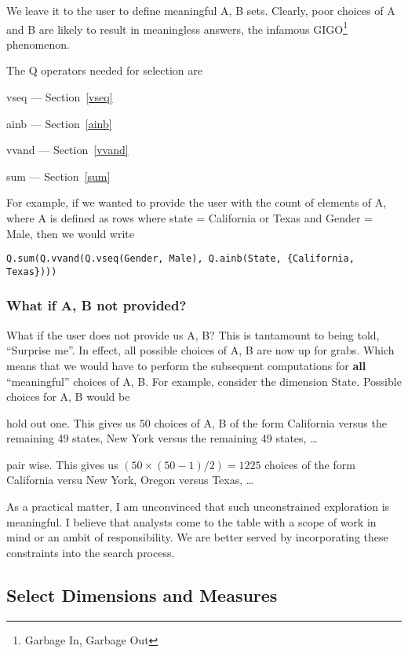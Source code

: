 We leave it to the user to define meaningful A, B sets.
Clearly, poor choices of A and B are likely to result in meaningless
answers, the infamous GIGO\footnote{Garbage In, Garbage Out} phenomenon.

The Q operators needed for selection are 
\be
\item vseq --- Section~\ref{vseq}
\item ainb --- Section~\ref{ainb}
\item vvand --- Section~\ref{vvand}
\item sum --- Section~\ref{sum}
\ee

For example, if we wanted to provide the user with the count of elements of A,
where A is defined as rows where state = California or Texas and Gender = Male,
then we would write
\begin{verbatim}
Q.sum(Q.vvand(Q.vseq(Gender, Male), Q.ainb(State, {California, Texas})))
\end{verbatim}


\subsubsection{What if A, B not provided?}

What if the user does not provide us A, B? This is tantamount to being told,
``Surprise me''. In effect, all possible choices of A, B are now up for grabs.
Which means that we would have to perform the subsequent computations for {\bf
all} ``meaningful'' choices of A, B. For example, consider the dimension State.
Possible choices for A, B would be
\be 
\item  hold out one. This gives us 50 choices of A, B of the form California
versus the remaining 49 states, New York versus the remaining 49 states, \ldots
\item pair wise. This gives us \((50 \times (50-1)/2) = 1225\) choices of the
form California versu New York, Oregon versus Texas, \ldots
\ee

As a practical matter, I am unconvinced that such unconstrained exploration is
meaningful. I believe that analysts come to the table with a scope of work in
mind or an ambit of responsibility. We are better served by incorporating these
constraints into the search process.



\subsection{Select Dimensions and Measures}
\label{DimsAndMeasures}

